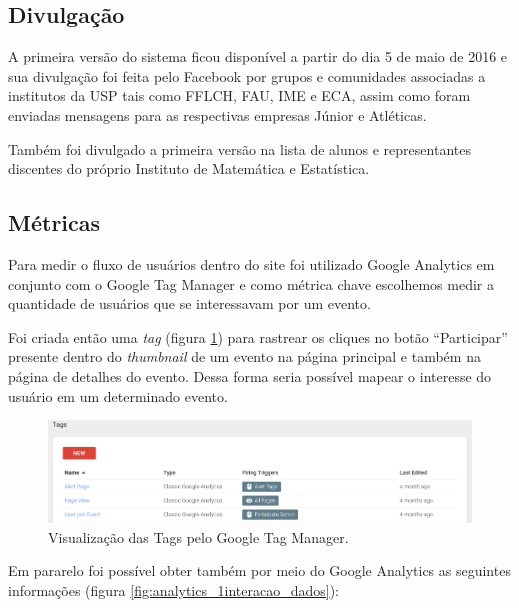 \subsection{Divulgação}
\par A primeira versão do sistema ficou disponível a partir do dia 5 de maio de 2016 e sua divulgação foi feita pelo Facebook por grupos e comunidades associadas a institutos da USP tais como FFLCH, FAU, IME e ECA, assim como foram enviadas mensagens para as respectivas empresas Júnior e Atléticas.
\par Também foi divulgado a primeira versão na lista de alunos e representantes discentes do próprio Instituto de Matemática e Estatística.
\subsection{Métricas}
\par Para medir o fluxo de usuários dentro do site foi utilizado Google Analytics em conjunto com o Google Tag Manager e como métrica chave escolhemos medir a quantidade de usuários que se interessavam por um evento.
\par Foi criada então uma \emph{tag} (figura \ref{fig:tags}) para rastrear os cliques no botão ``Participar'' presente dentro do \emph{thumbnail} de um evento na página principal e também na página de detalhes do evento. Dessa forma seria possível mapear o interesse do usuário em um determinado evento.
\begin{figure}[htb]
\centering
\includegraphics[width=15cm]{figuras/tags}
\caption{\label{fig:tags} Visualização das Tags pelo Google Tag Manager.}
\end{figure}
\par Em pararelo foi possível obter também por meio do Google Analytics as seguintes informações (figura \ref{fig:analytics_1interacao_dados}):
